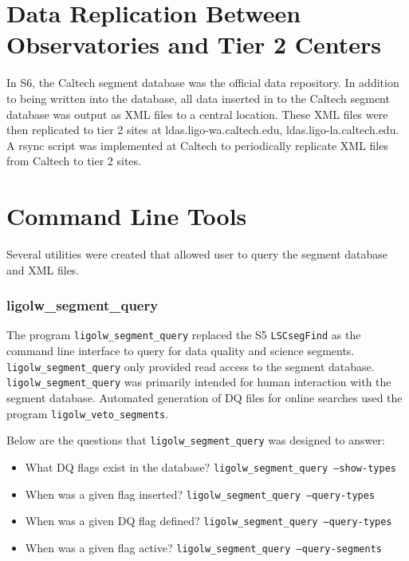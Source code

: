 \section{Data Replication Between Observatories and Tier 2 Centers}

In S6, the Caltech segment database was the official data repository.
In addition to being written into the database, all data inserted in
to the Caltech segment database was output as XML files to a
central location. These XML files were then replicated to tier 2
sites at ldas.ligo-wa.caltech.edu, ldas.ligo-la.caltech.edu. A rsync
script was implemented at Caltech to periodically replicate XML
files from Caltech to tier 2 sites.  


\section{Command Line Tools}

Several utilities were created that allowed user to query the segment
database and XML files.

\subsubsection{ligolw\_segment\_query}

The program \verb|ligolw_segment_query| replaced the S5
\verb|LSCsegFind| as the command line interface to query for data
quality and science segments.  \verb|ligolw_segment_query| only provided
read access to the segment database.  \verb|ligolw_segment_query|
was primarily intended for human interaction with the segment database.
Automated generation of DQ files for online searches used the
program \verb|ligolw_veto_segments|.

Below are the questions that \texttt{ligolw\_segment\_query} was
designed to answer:

\begin{itemize}
\item What DQ flags exist in the database?
\texttt{ligolw\_segment\_query --show-types}
\item When was a given flag inserted? \texttt{ligolw\_segment\_query
--query-types}
\item When was a given DQ flag defined? \texttt{ligolw\_segment\_query
--query-types}
\item When was a given flag active? \texttt{ligolw\_segment\_query
--query-segments}
\end{itemize}

